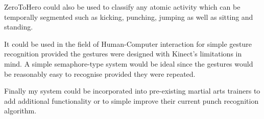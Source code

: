 \begin{figure}[h]
\centering
\begin{minipage}{7.0cm}
    \centering
    \label{fig:1}
\end{minipage}
\vspace{2.0cm}
\begin{minipage}{7.0cm}
    \centering
    \label{fig:2}
\end{minipage}
\end{figure}

ZeroToHero could also be used to classify any atomic activity\cite{Aggarwal2007} which can be temporally segmented such as kicking, punching, jumping as well as sitting and standing. 

It could be used in the field of Human-Computer interaction for simple gesture recognition provided the gestures were designed with Kinect's limitations in mind. A simple semaphore-type system would be ideal since the gestures would be reasonably easy to recognise provided they were repeated.

Finally my system could be incorporated into pre-existing martial arts trainers to add additional functionality or to simple improve their current punch recognition algorithm.

